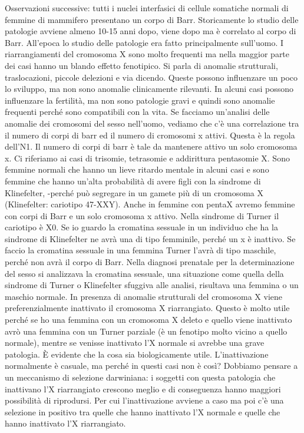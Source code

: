 \documentclass[11pt]{book}
\begin{document}
Osservazioni successive: tutti i nuclei interfasici di cellule somatiche normali di femmine di mammifero presentano un corpo di Barr.
Storicamente lo studio delle patologie avviene almeno 10-15 anni dopo, viene dopo ma è correlato al corpo di Barr. All’epoca lo studio delle patologie era fatto principalmente sull’uomo.
I riarrangiamenti del cromosoma X sono molto frequenti ma nella maggior parte dei casi hanno un blando effetto fenotipico. Si parla di anomalie strutturali, traslocazioni, piccole delezioni e via dicendo. Queste possono influenzare un poco lo sviluppo, ma non sono anomalie clinicamente rilevanti. In alcuni casi possono influenzare la fertilità, ma non sono patologie gravi e quindi sono anomalie frequenti perché sono compatibili con la vita. Se facciamo un’analisi delle anomalie dei cromosomi del sesso nell’uomo, vediamo che c’è una correlazione tra il numero di corpi di barr ed il numero di cromosomi x attivi. Questa è la regola dell’N1. Il numero di corpi di barr è tale da mantenere attivo un solo cromosoma x. Ci riferiamo ai casi di trisomie, tetrasomie e addirittura pentasomie X. Sono femmine normali che hanno un lieve ritardo mentale in alcuni casi e sono femmine che hanno un’alta probabilità di avere figli con la sindrome di Klinefelter, -perché può segregare in un gamete più di un cromosoma X (Klinefelter: cariotipo 47-XXY). Anche in femmine con pentaX avremo femmine con corpi di Barr e un solo cromosoma x attivo.  
Nella sindrome di Turner il cariotipo è X0. Se io guardo la cromatina sessuale in un individuo che ha la sindrome di Klinefelter ne avrà una di tipo femminile, perché un x è inattivo. Se faccio la cromatina sessuale in una femmina Turner l’avrà di tipo maschile, perché non avrà il corpo di Barr. Nella diagnosi prenatale per la determinazione del sesso si analizzava la cromatina sessuale, una situazione come quella della sindrome di Turner o Klinefelter sfuggiva alle analisi, risultava una femmina o un maschio normale.
In presenza di anomalie strutturali del cromosoma X viene preferenzialmente inattivato il cromosoma X riarrangiato. 
Questo è molto utile perché se ho una femmina con un cromosoma X deleto e quello viene inattivato avrò una femmina con un Turner parziale (è un fenotipo molto vicino a quello normale), mentre se venisse inattivato l’X normale si avrebbe una grave patologia. È evidente che la cosa sia biologicamente utile. L’inattivazione normalmente è casuale, ma perché in questi casi non è così? Dobbiamo pensare a un meccanismo di selezione darwiniana: i soggetti con questa patologia che inattivano l’X riarrangiato crescono meglio e di conseguenza hanno maggiori possibilità di riprodursi. Per cui l’inattivazione avviene a caso ma poi c’è una selezione in positivo tra quelle che hanno inattivato l’X normale e quelle che hanno inattivato l’X riarrangiato.
\end{document}
